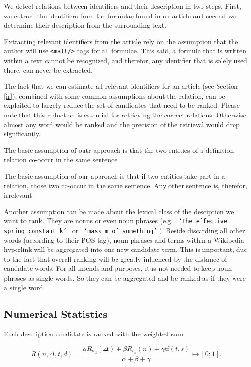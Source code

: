 \documentclass[runningheads]{llncs}
\begin{document}
We detect relations between identifiers and their description in two steps.
First, we extract the identifiers from the formulae found in an article and
second we determine their description from the surrounding text.

Extracting relevant identifiers from the article rely on the assumption that
the author will use \texttt{<math/>} tags for all formulae. This said, a
formula that is written within a text cannot be recognized, and therefor, any
identifier that is solely used there, can never be extracted.

The fact that we can estimate all relevant identifiers for an article (see
Section \ref{ir}), combined with some common assumptions about the relation,
can be exploited to largely reduce the set of candidates that need to be ranked.
Please note that this reduction is essential for retrieving the correct
relations. Otherwise almost any word would be ranked and the precision of the
retrieval would drop significantly.

The basic assumption of outr approach is that the two entities of a definition
relation co-occur in the same sentence.

The basic assumption of our approach is that if two entities take part in a
relation, those two co-occur in the same sentence.
Any other sentence is, therefor, irrelevant.

Another assumption can be made about the lexical class
of the desciption we want to rank. They are nouns or even noun phrases (e.g.
\texttt{ `the effective spring constant k' } or \texttt{ `mass m of
something'} ). Beside discarding all other words (according to their POS tag),
noun phrases and terms within a Wikipedia hyperlink will be aggregated into
one new candidate term. This is important, due to the fact that overall
ranking will be greatly infuenced by the distance of candidate words. For all
intends and purposes, it is not needed to keep noun phrases as single words.
So they can be aggregated and be ranked as if they were a single word.


\subsection{Numerical Statistics}

Each description candidate is ranked with the weighted sum

\begin{equation} \label{eq:rating}
R(n,\Delta,t,d)=\frac{\alpha{R}_{\sigma_\mathrm d}(\Delta)
+\beta{R}_{\sigma_\mathrm s}(n)
+\gamma\mathrm{tf}(t,s)}{\alpha+\beta+\gamma} \mapsto [0;1].
\end{equation}
\end{document}
